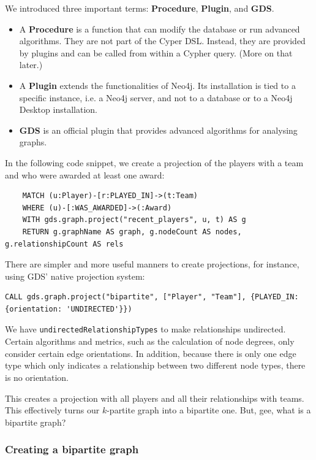 \documentclass{article}
\begin{document}
We introduced three important terms: \textbf{Procedure}, \textbf{Plugin}, and \textbf{GDS}.

\begin{itemize}
    \item A \textbf{Procedure} is a function that can modify the database or run advanced algorithms. They are not part of the Cyper DSL. Instead, they are provided by plugins and can be called from within a Cypher query. (More on that later.)
    \item A \textbf{Plugin} extends the functionalities of Neo4j. Its installation is tied to a specific instance, i.e. a Neo4j server, and not to a database or to a Neo4j Desktop installation.
    \item \textbf{GDS} is an official plugin that provides advanced algorithms for analysing graphs.
\end{itemize}

In the following code snippet, we create a projection of the players with a team and who were awarded at least one award:

\begin{lstlisting}
    MATCH (u:Player)-[r:PLAYED_IN]->(t:Team)
    WHERE (u)-[:WAS_AWARDED]->(:Award)
    WITH gds.graph.project("recent_players", u, t) AS g
    RETURN g.graphName AS graph, g.nodeCount AS nodes, g.relationshipCount AS rels
\end{lstlisting}

There are simpler and more useful manners to create projections, for instance, using GDS' native projection system:

\begin{lstlisting}
CALL gds.graph.project("bipartite", ["Player", "Team"], {PLAYED_IN: {orientation: 'UNDIRECTED'}})
\end{lstlisting}
 
We have \verb|undirectedRelationshipTypes| to make relationships undirected. Certain algorithms and metrics, such as the calculation of node degrees, only consider certain edge orientations. In addition, because there is only one edge type which only indicates a relationship between two different node types, there is no orientation.

This creates a projection with all players and all their relationships with teams. This effectively turns our $k$-partite graph into a bipartite one. But, gee, what is a bipartite graph?

\subsubsection{Creating a bipartite graph}
\end{document}
